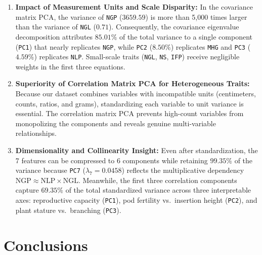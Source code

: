 \documentclass[11pt,a4paper]{article}
\begin{document}
\begin{enumerate}
    \item \textbf{Impact of Measurement Units and Scale Disparity:} In the covariance matrix PCA, the variance of \texttt{NGP} ($3659.59$) is more than 5,000 times larger than the variance of \texttt{NGL} ($0.71$). Consequently, the covariance eigenvalue decomposition attributes $85.01\%$ of the total variance to a single component (\texttt{PC1}) that nearly replicates \texttt{NGP}, while \texttt{PC2} ($8.50\%$) replicates \texttt{MHG} and \texttt{PC3} ($4.59\%$) replicates \texttt{NLP}. Small-scale traits (\texttt{NGL}, \texttt{NS}, \texttt{IFP}) receive negligible weights in the first three equations.
    \item \textbf{Superiority of Correlation Matrix PCA for Heterogeneous Traits:} Because our dataset combines variables with incompatible units (centimeters, counts, ratios, and grams), standardizing each variable to unit variance is essential. The correlation matrix PCA prevents high-count variables from monopolizing the components and reveals genuine multi-variable relationships.
    \item \textbf{Dimensionality and Collinearity Insight:} Even after standardization, the 7 features can be compressed to 6 components while retaining $99.35\%$ of the variance because \texttt{PC7} ($\lambda_7 = 0.0458$) reflects the multiplicative dependency $\text{NGP} \approx \text{NLP} \times \text{NGL}$. Meanwhile, the first three correlation components capture $69.35\%$ of the total standardized variance across three interpretable axes: reproductive capacity (\texttt{PC1}), pod fertility vs.\ insertion height (\texttt{PC2}), and plant stature vs.\ branching (\texttt{PC3}).
\end{enumerate}

\section{Conclusions}
\end{document}
